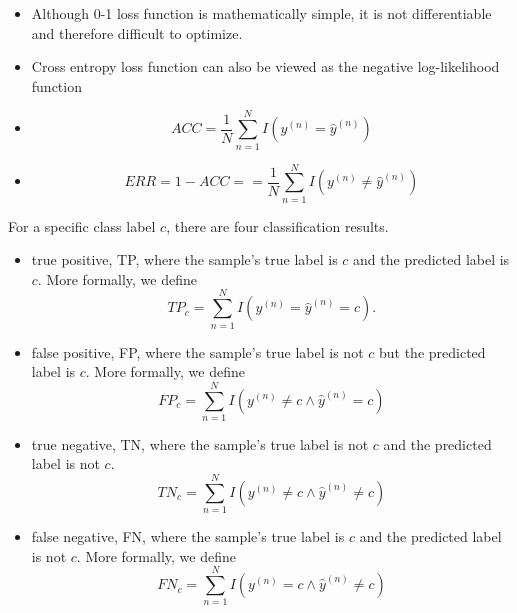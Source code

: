 \begin{refsection}
\begin{example}
\begin{itemize}
\end{itemize}


\end{example}


\begin{remark}
\begin{itemize}
	\item Although 0-1 loss function is mathematically simple, it is not differentiable and therefore difficult to optimize.
	\item Cross entropy loss function can also be viewed as the negative log-likelihood function
\end{itemize}
\end{remark}



\begin{definition}[accuracy]\cite[47]{Qiu2019NeuralLearning}
	\begin{itemize}
		\item 
		$$ACC = \frac{1}{N} \sum_{n=1}^{N} I\left(y^{(n)}=\hat{y}^{(n)}\right)$$
		\item 
		$$
		ERR = 1 - ACC = =\frac{1}{N} \sum_{n=1}^{N} I\left(y^{(n)} \neq \hat{y}^{(n)}\right)
		$$
	\end{itemize}
	
	For a specific class label $c$, there are four classification results.
	\begin{itemize}
		\item true positive, TP, where the sample's true label is $c$ and the predicted label is $c$. More formally, we define
		$$TP_{c}=\sum_{n=1}^{N} I\left(y^{(n)}=\hat{y}^{(n)}=c\right).$$		
		\item false positive, FP, where the sample's true label is not $c$ but the predicted label is $c$. More formally, we define
		$$FP_{c}=\sum_{n=1}^{N} I\left(y^{(n)} \neq c \wedge \hat{y}^{(n)}=c\right)$$
		
		\item true negative, TN, where the sample's true label is not $c$ and the predicted label is not $c$.
		$$TN_{c}=\sum_{n=1}^{N} I\left(y^{(n)}\neq c \wedge \hat{y}^{(n)} \neq c\right)$$
		
		
		\item false negative, FN, where the sample's true label is $c$ and the predicted label is not $c$. More formally, we define
		$$FN_{c}=\sum_{n=1}^{N} I\left(y^{(n)}=c \wedge \hat{y}^{(n)} \neq c\right)$$
		
		
	\end{itemize}
	

\end{definition}
\end{refsection}
